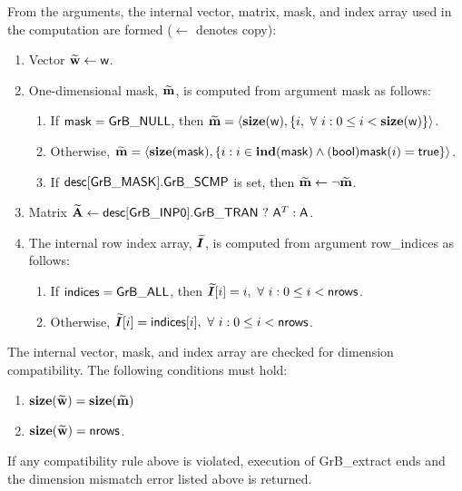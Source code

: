 From the arguments, the internal vector, matrix, mask, and index array used in 
the computation are formed ($\leftarrow$ denotes copy):
\begin{enumerate}
	\item Vector ${\bf \widetilde{w}} \leftarrow {\sf w}$.

	\item One-dimensional mask, ${\bf \widetilde{m}}$, is computed from 
    argument {\sf mask} as follows:
	\begin{enumerate}
		\item	If ${\sf mask} = {\sf GrB\_NULL}$, then ${\bf \widetilde{m}} = 
        \langle \bold{size}({\sf w}), \{i, \ \forall \ i : 0 \leq i < 
        \bold{size}({\sf w}) \} \rangle$.

		\item	Otherwise, ${\bf \widetilde{m}} = 
        \langle \bold{size}({\sf mask}), \{i : i \in \bold{ind}({\sf mask}) \wedge
        ({\sf bool}){\sf mask}(i) = {\sf true} \} \rangle$.

		\item	If ${\sf desc[GrB\_MASK].GrB\_SCMP}$ is set, then 
        ${\bf \widetilde{m}} \leftarrow \neg {\bf \widetilde{m}}$.
	\end{enumerate}

	\item Matrix ${\bf \widetilde{A}} \leftarrow 
    {\sf desc[GrB\_INP0].GrB\_TRAN} \ ? \ {\sf A}^T : {\sf A}$.
    
    \item The internal row index array, $\bm{\widetilde{I}}$, is computed from 
    argument {\sf row\_indices} as follows:
	\begin{enumerate}
		\item	If ${\sf indices} = {\sf GrB\_ALL}$, then 
        $\bm{\widetilde{I}}[i] = i, \ \forall \ i : 0 \leq i < {\sf nrows}$.

		\item	Otherwise, $\bm{\widetilde{I}}[i] = {\sf indices}[i], 
        \ \forall \ i : 0 \leq i < {\sf nrows}$.
    \end{enumerate}
\end{enumerate}

The internal vector, mask, and index array are checked for dimension 
compatibility.  The following conditions must hold:
\begin{enumerate}
	\item $\bold{size}({\bf \widetilde{w}}) = \bold{size}({\bf \widetilde{m}})$

    \item $\bold{size}({\bf \widetilde{w}}) = {\sf nrows}$.
\end{enumerate}
If any compatibility rule above is violated, execution of {\sf GrB\_extract} ends and 
the dimension mismatch error listed above is returned.

